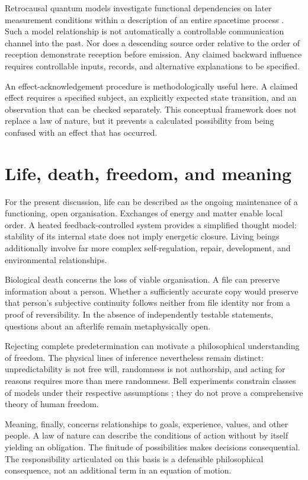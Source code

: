 Retrocausal quantum models investigate functional dependencies on later measurement conditions within a description of an entire spacetime process \cite{15}. Such a model relationship is not automatically a controllable communication channel into the past. Nor does a descending source order relative to the order of reception demonstrate reception before emission. Any claimed backward influence requires controllable inputs, records, and alternative explanations to be specified.

An effect-acknowledgement procedure is methodologically useful here. A claimed effect requires a specified subject, an explicitly expected state transition, and an observation that can be checked separately. This conceptual framework does not replace a law of nature, but it prevents a calculated possibility from being confused with an effect that has occurred.

\section{Life, death, freedom, and meaning}\label{en:sec11}
For the present discussion, life can be described as the ongoing maintenance of a functioning, open organisation. Exchanges of energy and matter enable local order. A heated feedback-controlled system provides a simplified thought model: stability of its internal state does not imply energetic closure. Living beings additionally involve far more complex self-regulation, repair, development, and environmental relationships.

Biological death concerns the loss of viable organisation. A file can preserve information about a person. Whether a sufficiently accurate copy would preserve that person's subjective continuity follows neither from file identity nor from a proof of reversibility. In the absence of independently testable statements, questions about an afterlife remain metaphysically open.

Rejecting complete predetermination can motivate a philosophical understanding of freedom. The physical lines of inference nevertheless remain distinct: unpredictability is not free will, randomness is not authorship, and acting for reasons requires more than mere randomness. Bell experiments constrain classes of models under their respective assumptions \cite{11}; they do not prove a comprehensive theory of human freedom.

Meaning, finally, concerns relationships to goals, experience, values, and other people. A law of nature can describe the conditions of action without by itself yielding an obligation. The finitude of possibilities makes decisions consequential. The responsibility articulated on this basis is a defensible philosophical consequence, not an additional term in an equation of motion.

